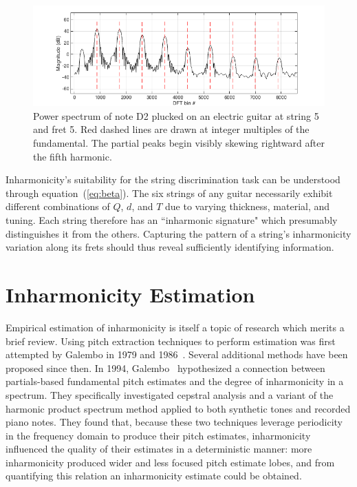 \documentclass[12pt]{cmuthesis}
\begin{document}
\begin{figure}[!htbp]
\centering
\includegraphics[scale=0.65]{skew}
\caption{Power spectrum of note D2 plucked on an electric guitar at string 5 and fret 5. Red dashed lines are drawn at integer multiples of the fundamental. The partial peaks begin visibly skewing rightward after the fifth harmonic.}
\label{fig:skew}
\end{figure}

Inharmonicity's suitability for the string discrimination task can be understood through equation~(\ref{eq:beta}). The six strings of any guitar necessarily exhibit different combinations of $Q$, $d$, and $T$ due to varying thickness, material, and tuning. Each string therefore has an ``inharmonic signature" which presumably distinguishes it from the others. Capturing the pattern of a string's inharmonicity variation along its frets should thus reveal sufficiently identifying information.

\section{Inharmonicity Estimation}
\label{lit-beta-est}
Empirical estimation of inharmonicity is itself a topic of research which merits a brief review. Using pitch extraction techniques to perform estimation was first attempted by Galembo in 1979 and 1986~\cite{galembo1979,galembo1987}. Several additional methods have been proposed since then. In 1994, Galembo~\cite{galembo1994} hypothesized a connection between partials-based fundamental pitch estimates and the degree of inharmonicity in a spectrum. They specifically investigated cepstral analysis and a variant of the harmonic product spectrum method applied to both synthetic tones and recorded piano notes. They found that, because these two techniques leverage periodicity in the frequency domain to produce their pitch estimates, inharmonicity influenced the quality of their estimates in a deterministic manner: more inharmonicity produced wider and less focused pitch estimate lobes, and from quantifying this relation an inharmonicity estimate could be obtained.
 
\end{document}
